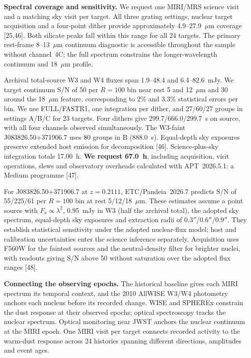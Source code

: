 \documentclass[12pt]{article}
\begin{document}
\descriptionofobservations

\noindent\textbf{Spectral coverage and sensitivity.}
We request one MIRI/MRS science visit and a matching sky visit per target. All three grating settings, nuclear target acquisition and a four-point dither provide approximately 4.9--27.9~$\mu$m coverage [25,46]. Both silicate peaks fall within this range for all 24 targets. The primary rest-frame 8--13~$\mu$m continuum diagnostic is accessible throughout the sample without channel~4C; the full spectrum constrains the longer-wavelength continuum and 18~$\mu$m profile.

Archival total-source W3 and W4 fluxes span 1.9--48.4 and 6.4--82.6~mJy. We target continuum S/N of 50 per $R=100$ bin near rest 5 and 12~$\mu$m and 30 around the 18~$\mu$m feature, corresponding to 2\% and 3.3\% statistical errors per bin. We use FULL/FASTR1, one integration per dither, and 27/60/27 groups in settings A/B/C for 23 targets. Four dithers give 299.7/666.0/299.7~s on source, with all four channels observed simultaneously. The W3-faint J083826.50+371906.7 uses 80 groups in B (888.0~s). Equal-depth sky exposures preserve extended host emission for decomposition [46]. Science-plus-sky integration totals 17.00~h. \textbf{We request 67.0~h}, including acquisition, visit operations, slews and observatory overheads calculated with APT~2026.5.1: a Medium programme [47].

For J083826.50+371906.7 at $z=0.2111$, ETC/Pandeia~2026.7 predicts S/N of 55/225/61 per $R=100$ bin at rest 5/12/18~$\mu$m. These estimates assume a point source with $F_\nu\propto\lambda^2$, 0.95~mJy in W3 (half the archival total), the adopted sky spectrum, equal-depth sky exposures and extraction radii of $0.3''$/$0.6''$/$0.9''$. They establish statistical sensitivity under the adopted nuclear-flux model; host and calibration uncertainties enter the science inference separately. Acquisition uses F560W for the faintest sources and the neutral-density filter for brighter nuclei, with readouts giving S/N above 50 without saturation over the adopted flux ranges [48].

\noindent\textbf{Connecting the observing epochs.}
The historical baseline gives each MIRI spectrum its temporal context, and the 2010 AllWISE W3/W4 photometry anchors each nucleus before its recorded change. WISE and SPHEREx constrain the dust response at their observed epochs; optical spectroscopy tracks the nuclear spectrum. Optical monitoring near JWST anchors the nuclear continuum at the MIRI epoch. One MIRI visit per target connects recorded activity to the warm-dust response across 24 histories spanning different directions, amplitudes and event ages.
\end{document}
